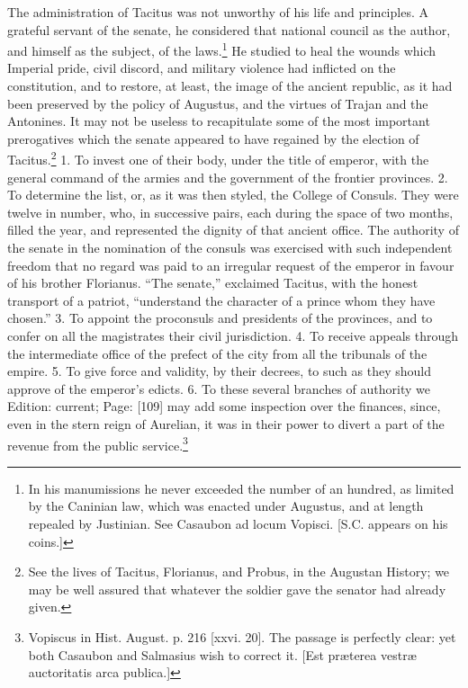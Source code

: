 The administration of Tacitus was not unworthy of his life and principles. A grateful servant of the senate, he considered that national council as the author, and himself as the subject, of the laws.\footnote{In his manumissions he never exceeded the number of an hundred, as limited by the Caninian law, which was enacted under Augustus, and at length repealed by Justinian. See Casaubon ad locum Vopisci. [S.C. appears on his coins.]} He studied to heal the wounds which Imperial pride, civil discord, and military violence had inflicted on the constitution, and to restore, at least, the image of the ancient republic, as it had been preserved by the policy of Augustus, and the virtues of Trajan and the Antonines. It may not be useless to recapitulate some of the most important prerogatives which the senate appeared to have regained by the election of Tacitus.\footnote{See the lives of Tacitus, Florianus, and Probus, in the Augustan History; we may be well assured that whatever the soldier gave the senator had already given.} 1. To invest one of their body, under the title of emperor, with the general command of the armies and the government of the frontier provinces. 2. To determine the list, or, as it was then styled, the College of Consuls. They were twelve in number, who, in successive pairs, each during the space of two months, filled the year, and represented the dignity of that ancient office. The authority of the senate in the nomination of the consuls was exercised with such independent freedom that no regard was paid to an irregular request of the emperor in favour of his brother Florianus. \texthebrew{“}The senate,\texthebrew{}” exclaimed Tacitus, with the honest transport of a patriot, \texthebrew{“}understand the character of a prince whom they have chosen.\texthebrew{}” 3. To appoint the proconsuls and presidents of the provinces, and to confer on all the magistrates their civil jurisdiction. 4. To receive appeals through the intermediate office of the prefect of the city from all the tribunals of the empire. 5. To give force and validity, by their decrees, to such as they should approve of the emperor\texthebrew{}’s edicts. 6. To these several branches of authority we Edition: current; Page: [109] may add some inspection over the finances, since, even in the stern reign of Aurelian, it was in their power to divert a part of the revenue from the public service.\footnote{Vopiscus in Hist. August. p. 216 [xxvi. 20]. The passage is perfectly clear: yet both Casaubon and Salmasius wish to correct it. [Est præterea vestræ auctoritatis arca publica.]}

